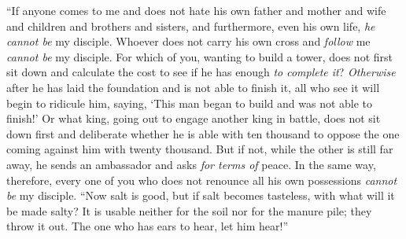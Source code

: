 \begin{biblechapter}
\verse “If anyone comes to me and does not hate his own father and mother and wife and children and brothers and sisters, and furthermore, even his own life, \textit{he cannot be} my disciple.
\verse Whoever does not carry his own cross and \textit{follow} me \textit{cannot be} my disciple.
\verse For which of you, wanting to build a tower, does not first sit down and calculate the cost to see if he has enough \textit{to complete it}?
\verse \textit{Otherwise} after he has laid the foundation and is not able to finish it, all who see it will begin to ridicule him,
\verse saying, ‘This man began to build and was not able to finish!’
\verse Or what king, going out to engage another king in battle, does not sit down first and deliberate whether he is able with ten thousand to oppose the one coming against him with twenty thousand.
\verse But if not, while the other is still far away, he sends an ambassador and asks \textit{for terms of} peace.
\verse In the same way, therefore, every one of you who does not renounce all his own possessions \textit{cannot be} my disciple.
\verse “Now salt is good, but if salt becomes tasteless, with what will it be made salty?
\verse It is usable neither for the soil nor for the manure pile; they throw it out. The one who has ears to hear, let him hear!”
\end{biblechapter}

